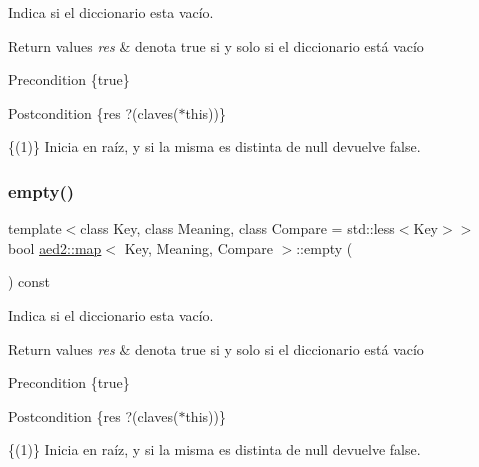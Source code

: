 Indica si el diccionario esta vacío. 


\begin{DoxyRetVals}{Return values}
{\em res} & denota true si y solo si el diccionario está vacío\\
\hline
\end{DoxyRetVals}
\begin{DoxyPrecond}{Precondition}
\{true\} 
\end{DoxyPrecond}
\begin{DoxyPostcond}{Postcondition}
\{res   ?(claves($\ast$this))\}
\end{DoxyPostcond}
\{(1)\} Inicia en raíz, y si la misma es distinta de null devuelve false. \mbox{\label{classaed2_1_1map_a0dcb39283f4877ae59cb756ed1d0c048}} 
\subsubsection{\texorpdfstring{empty()}{empty()}\hspace{0.1cm}{\footnotesize\ttfamily [2/2]}}
{\footnotesize\ttfamily template$<$class Key, class Meaning, class Compare = std\+::less$<$\+Key$>$$>$ \\
bool \hyperlink{classaed2_1_1map}{aed2\+::map}$<$ Key, Meaning, Compare $>$\+::empty (\begin{DoxyParamCaption}{ }\end{DoxyParamCaption}) const\hspace{0.3cm}{\ttfamily [inline]}}



Indica si el diccionario esta vacío. 


\begin{DoxyRetVals}{Return values}
{\em res} & denota true si y solo si el diccionario está vacío\\
\hline
\end{DoxyRetVals}
\begin{DoxyPrecond}{Precondition}
\{true\} 
\end{DoxyPrecond}
\begin{DoxyPostcond}{Postcondition}
\{res   ?(claves($\ast$this))\}
\end{DoxyPostcond}
\{(1)\} Inicia en raíz, y si la misma es distinta de null devuelve false. \mbox{\label{classaed2_1_1map_a76023e6a56cb625513e1b5ea028bf983}} 
